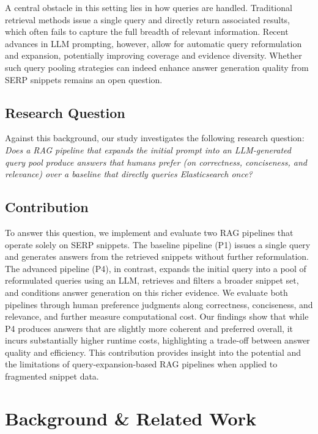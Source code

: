 \documentclass[manuscript,screen]{acmart}
\begin{document}
\begin{CCSXML}
A central obstacle in this setting lies in how queries are handled. Traditional retrieval methods issue a single query and directly return associated results, which often fails to capture the full breadth of relevant information. Recent advances in LLM prompting, however, allow for automatic query reformulation and expansion, potentially improving coverage and evidence diversity. Whether such query pooling strategies can indeed enhance answer generation quality from SERP snippets remains an open question.

	\subsection{Research Question}
	\label{subsec:research-question}
	Against this background, our study investigates the following research question: 
	\emph{Does a RAG pipeline that expands the initial prompt into an LLM-generated query pool produce answers that humans prefer (on correctness, conciseness, and relevance) over a baseline that directly queries Elasticsearch once?}
	
	\subsection{Contribution}
	\label{subsec:contribution}
	To answer this question, we implement and evaluate two RAG pipelines that operate solely on SERP snippets. The baseline pipeline (P1) issues a single query and generates answers from the retrieved snippets without further reformulation. The advanced pipeline (P4), in contrast, expands the initial query into a pool of reformulated queries using an LLM, retrieves and filters a broader snippet set, and conditions answer generation on this richer evidence. We evaluate both pipelines through human preference judgments along correctness, conciseness, and relevance, and further measure computational cost. Our findings show that while P4 produces answers that are slightly more coherent and preferred overall, it incurs substantially higher runtime costs, highlighting a trade-off between answer quality and efficiency. This contribution provides insight into the potential and the limitations of query-expansion-based RAG pipelines when applied to fragmented snippet data.

\section{Background \& Related Work}
\label{sec:background}


\end{CCSXML}
\end{document}
